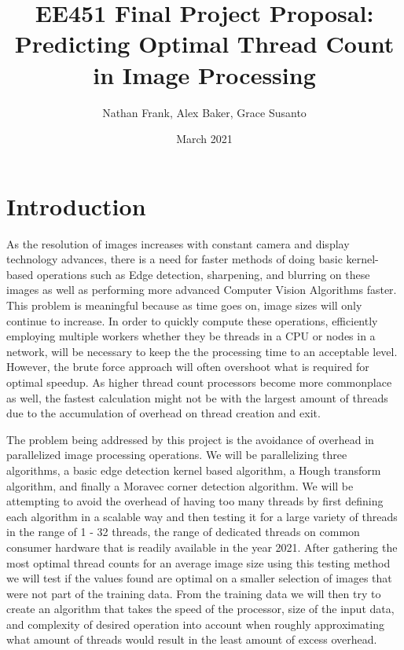 \documentclass{article}
\title{EE451 Final Project Proposal: \\Predicting Optimal Thread Count in Image Processing}
\author{Nathan Frank, Alex Baker, Grace Susanto}
\date{March 2021}
\begin{document}
    \maketitle
    \tableofcontents
    \pagebreak
    
    \section{Introduction}
        \begin{multicols}{2}
            As the resolution of images increases with constant camera and display technology advances, there is a need for faster methods of doing basic kernel-based operations such as Edge detection, sharpening, and blurring on these images as well as performing more advanced Computer Vision Algorithms faster.  This problem is meaningful because as time goes on, image sizes will only continue to increase.  In order to quickly compute these operations, efficiently employing multiple workers whether they be threads in a CPU or nodes in a network, will be necessary to keep the the processing time to an acceptable level.  However, the brute force approach will often overshoot what is required for optimal speedup.  As higher thread count processors become more commonplace as well, the fastest calculation might not be with the largest amount of threads due to the accumulation of overhead on thread creation and exit.
            
            The problem being addressed by this project is the avoidance of overhead in parallelized image processing operations.  We will be parallelizing three algorithms, a basic edge detection kernel based algorithm, a Hough transform algorithm, and finally a Moravec corner detection algorithm.  We will be attempting to avoid the overhead of having too many threads by first defining each algorithm in a scalable way and then testing it for a large variety of threads in the range of 1 - 32 threads, the range of dedicated threads on common consumer hardware that is readily available in the year 2021.  After gathering the most optimal thread counts for an average image size using this testing method we will test if the values found are optimal on a smaller selection of images that were not part of the training data.  From the training data we will then try to create an algorithm that takes the speed of the processor, size of the input data, and complexity of desired operation into account when roughly approximating what amount of threads would result in the least amount of excess overhead.
            
        \end{multicols}
        \pagebreak
    
\end{document}
